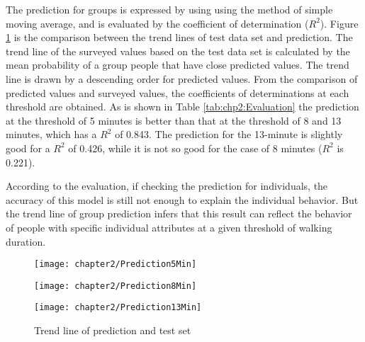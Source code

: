 The prediction for groups is expressed by using using the method of simple moving average, and is evaluated by the coefficient of determination ($R^2$). Figure \ref{fig:chp2:Prediction} is the comparison between the trend lines of test data set and prediction. The trend line of the surveyed values based on the test data set is calculated by the mean probability of a group people that have close predicted values. The trend line is drawn by a descending order for predicted values. From the comparison of predicted values and surveyed values, the coefficients of determinations at each threshold are obtained. As is shown in Table \ref{tab:chp2:Evaluation} the prediction at the threshold of 5 minutes is better than that at the threshold of 8 and 13 minutes, which has a $R^2$ of 0.843. The prediction for the 13-minute is slightly good for a $R^2$ of 0.426, while it is not so good for the case of 8 minutes ($R^2$ is 0.221). 

According to the evaluation, if checking the prediction for individuals, the accuracy of this model is still not enough to explain the individual behavior. But the trend line of group prediction infers that this result can reflect the behavior of people with specific individual attributes at a given threshold of walking duration. 

\begin{figure}[htbp]
	\centering
	\begin{minipage}{0.49\linewidth}
		\centering
		\texttt{[image: chapter2/Prediction5Min]} \\
		\label{note:tab:chp2:Prediction5}
	\end{minipage}
	\hfill %
	\begin{minipage}{0.49\linewidth}
		\centering
		\texttt{[image: chapter2/Prediction8Min]} \\
		\label{note:tab:chp2:Prediction8}
	\end{minipage}
	
	\vfill %
	\begin{minipage}{0.49\linewidth}
		\centering
		\texttt{[image: chapter2/Prediction13Min]} \\
		\label{note:tab:chp2:Prediction13}
	\end{minipage}

	\caption{Trend line of prediction and test set}
	\label{fig:chp2:Prediction}
\end{figure}

